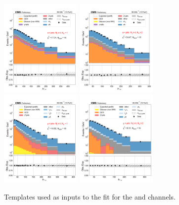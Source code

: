 \begin{figure}[htb!]
    \centering
    \includegraphics[width=0.35\textwidth]{chapters/Analysis/sectionStatisticalAnalysis/figures/fit/ejet_cat_gt4_eq1}
    \includegraphics[width=0.35\textwidth]{chapters/Analysis/sectionStatisticalAnalysis/figures/fit/ejet_cat_gt4_gt2}
    \includegraphics[width=0.35\textwidth]{chapters/Analysis/sectionStatisticalAnalysis/figures/fit/mujet_cat_gt4_eq1}
    \includegraphics[width=0.35\textwidth]{chapters/Analysis/sectionStatisticalAnalysis/figures/fit/mujet_cat_gt4_gt2}
    \caption{Templates used as inputs to the fit for the \ceh and \cmh channels.}
    \label{fig:analysis:method:mle:fit_templates_l4j}
\end{figure}



